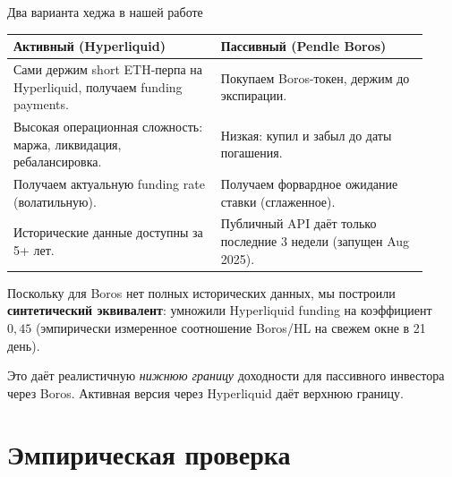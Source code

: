 \documentclass[11pt,aspectratio=169]{beamer}
\begin{document}
\begin{frame}{Два варианта хеджа в нашей работе}
  \footnotesize
  \begin{tabular}{p{0.46\linewidth}p{0.46\linewidth}}
    \toprule
    \textbf{Активный (Hyperliquid)} & \textbf{Пассивный (Pendle Boros)} \\
    \midrule
    Сами держим short ETH-перпа на Hyperliquid, получаем funding payments. &
    Покупаем Boros-токен, держим до экспирации. \\
    \addlinespace[2pt]
    Высокая операционная сложность: маржа, ликвидация, ребалансировка. &
    Низкая: купил и забыл до даты погашения. \\
    \addlinespace[2pt]
    Получаем актуальную funding rate (волатильную). &
    Получаем форвардное ожидание ставки (сглаженное). \\
    \addlinespace[2pt]
    Исторические данные доступны за 5+ лет. &
    Публичный API даёт только последние 3 недели (запущен Aug 2025). \\
    \bottomrule
  \end{tabular}

  \vspace{0.5em}
  \normalsize
  Поскольку для Boros нет полных исторических данных, мы построили
  \textbf{синтетический эквивалент}: умножили Hyperliquid funding на
  коэффициент $0{,}45$ (эмпирически измеренное соотношение Boros/HL
  на свежем окне в 21 день).

  \vspace{0.3em}
  Это даёт реалистичную \emph{нижнюю границу} доходности для пассивного
  инвестора через Boros. Активная версия через Hyperliquid даёт
  верхнюю границу.
\end{frame}

\section{Эмпирическая проверка}
\end{document}
